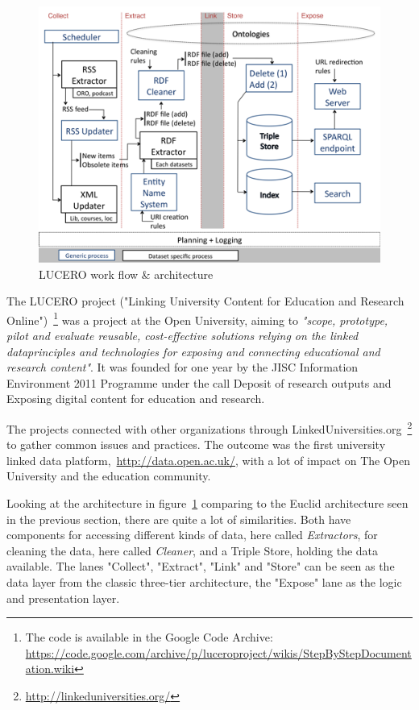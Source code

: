 
\begin{figure}[htbp]
	\centering
\includegraphics[width=\textwidth]{img/lucero_architecture.png}
	\caption{LUCERO work flow \& architecture}
	\label{lucero_architecture}
\end{figure}

The LUCERO project ("Linking University Content for Education and Research Online")~\footnote{The code is available in the Google Code Archive: \url{https://code.google.com/archive/p/luceroproject/wikis/StepByStepDocumentation.wiki}} was a project at the Open University, aiming to \emph{"scope, prototype, pilot and evaluate reusable, cost-effective solutions relying on the linked dataprinciples and technologies for exposing and connecting educational and research content"}. It was founded for one year by the JISC Information Environment 2011 Programme under the call Deposit of research outputs and Exposing digital content for education and research.~\cite{lucero:about}

The projects connected with other organizations through LinkedUniversities.org~\footnote{\url{http://linkeduniversities.org/}} to gather common issues and practices. The outcome was the first university linked data platform,~\url{http://data.open.ac.uk/}, with a lot of impact on The Open University and the education community.

Looking at the architecture in figure~\ref{lucero_architecture} comparing to the Euclid architecture seen in the previous section, there are quite a lot of similarities. Both have components for accessing different kinds of data, here called \emph{Extractors}, for cleaning the data, here called \emph{Cleaner}, and a Triple Store, holding the data available. The lanes "Collect", "Extract", "Link" and "Store" can be seen as the data layer from the classic three-tier architecture, the "Expose" lane as the logic and presentation layer. 

